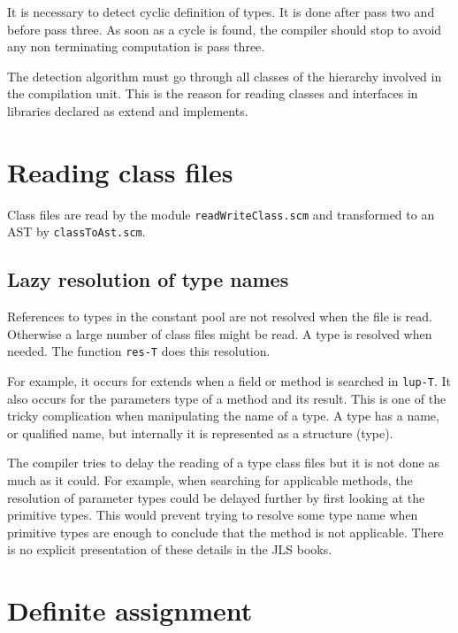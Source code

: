 \documentclass{book}
\newcommand{\func}[1]{\verb+#1+}
\newcommand{\file}[1]{\verb+#1+}
\begin{document}
It is necessary to detect cyclic definition of types. It is done after
pass two and before pass three. As soon as a cycle is found, the
compiler should stop to avoid any non terminating computation is pass
three.

The detection algorithm must go through all classes of the hierarchy
involved in the compilation unit. This is the reason for reading
classes and interfaces in libraries declared as extend and implements.

\section{Reading class files}

Class files are read by the module \file{readWriteClass.scm} and
transformed to an AST by \file{classToAst.scm}.

\subsection{Lazy resolution of type names}

References to types in the constant pool are not resolved when the
file is read. Otherwise a large number of class files might be read.
A type is resolved when needed. The function \func{res-T} does this
resolution.

For example, it occurs for extends when a field or method is searched
in \func{lup-T}. It also occurs for the parameters type of a method
and its result. This is one of the tricky complication when
manipulating the name of a type. A type has a name, or qualified name,
but internally it is represented as a structure (type).

The compiler tries to delay the reading of a type class files but it
is not done as much as it could. For example, when searching for
applicable methods, the resolution of parameter types could be delayed
further by first looking at the primitive types. This would prevent
trying to resolve some type name when primitive types are enough to
conclude that the method is not applicable. There is no explicit
presentation of these details in the JLS books.

\section{Definite assignment}
\end{document}
